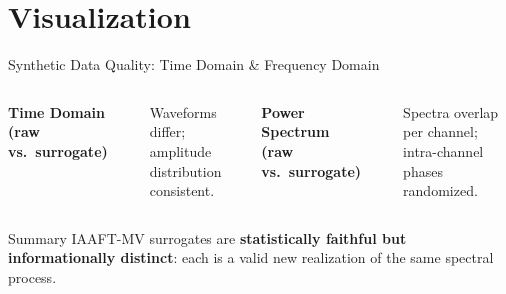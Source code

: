 \documentclass[aspectratio=169,10pt]{beamer}
\begin{document}
\section{Visualization}

\begin{frame}{Synthetic Data Quality: Time Domain \& Frequency Domain}
  \begin{columns}[T]
      \textbf{Time Domain (raw vs.\ surrogate)}
      \vspace{0.3em}

      \begin{center}
      \end{center}
      {\small Waveforms differ; amplitude distribution consistent.}

      \textbf{Power Spectrum (raw vs.\ surrogate)}
      \vspace{0.3em}

      \begin{center}
      \end{center}
      {\small Spectra overlap per channel; intra-channel phases randomized.}
  \end{columns}
  \vspace{0.3em}
  \begin{block}{Summary}
    IAAFT-MV surrogates are \textbf{statistically faithful but
    informationally distinct}: each is a valid new realization of
    the same spectral process.
  \end{block}
\end{frame}
\end{document}
